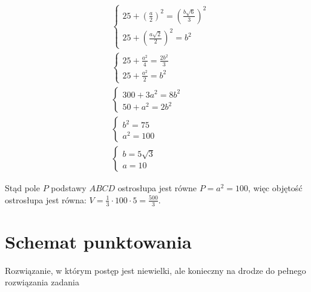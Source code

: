 \documentclass[10pt]{article}
\begin{document}
$$
\begin{aligned}
& \left\{\begin{array}{l}
25+\left(\frac{a}{2}\right)^{2}=\left(\frac{b \sqrt{6}}{3}\right)^{2} \\
25+\left(\frac{a \sqrt{2}}{2}\right)^{2}=b^{2}
\end{array}\right. \\
& \left\{\begin{array}{l}
25+\frac{a^{2}}{4}=\frac{2 b^{2}}{3} \\
25+\frac{a^{2}}{2}=b^{2}
\end{array}\right. \\
& \left\{\begin{array}{l}
300+3 a^{2}=8 b^{2} \\
50+a^{2}=2 b^{2}
\end{array}\right. \\
& \left\{\begin{array}{l}
b^{2}=75 \\
a^{2}=100
\end{array}\right. \\
& \left\{\begin{array}{l}
b=5 \sqrt{3} \\
a=10
\end{array}\right.
\end{aligned}
$$

Stąd pole $P$ podstawy $A B C D$ ostrosłupa jest równe $P=a^{2}=100$, więc objętość ostrosłupa jest równa: $V=\frac{1}{3} \cdot 100 \cdot 5=\frac{500}{3}$.

\section*{Schemat punktowania}
Rozwiązanie, w którym postęp jest niewielki, ale konieczny na drodze do pełnego rozwiązania zadania
\end{document}
